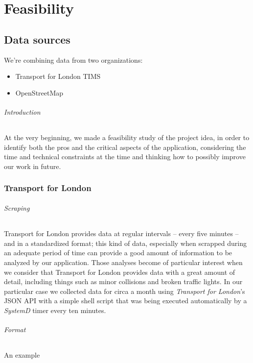 
\part{Feasibility}
\chapter{Data sources}

We’re combining data from two organizations:

\begin{itemize}
	\item Transport for London TIMS
	\item OpenStreetMap
\end{itemize}

\paragraph{Introduction}
At the very beginning, we made a feasibility study of the project idea, in 
order to identify both the pros and the critical aspects of the application, 
considering the time and technical constraints at the time and thinking how to 
possibly improve our work in future.

\section{Transport for London}

\paragraph{Scraping}
Transport for London provides data at regular intervals – every five 
minutes –  and in a standardized format; this kind of data, especially when 
scrapped during an adequate period of time can provide a good amount of 
information to be analyzed by our application. Those analyses become of 
particular interest when we consider that Transport for London provides 
data with a great amount of detail, including things such as minor collisions 
and broken traffic lights. In our particular case we collected data for circa a 
month using \textit{Transport for London}’s JSON API with a simple shell script 
that was being executed 
automatically by a \textit{SystemD} timer every ten minutes.

\paragraph{Format}
An example 

